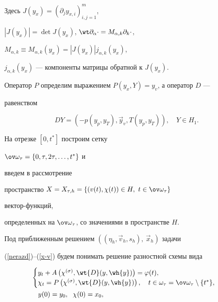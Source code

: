 Здесь $J(y_x)=(\partial_{j}y_{x,i})^m_{i,j=1}$,


$|J(y_x)|=\det J(y_x)$, $\wt \partial_{\alpha}\cdot=


M_{\alpha,k}\partial_{k}\cdot$,


$M_{\alpha,k}\equiv M_{\alpha,k}(y_x)=|J(y_x)| j_{\alpha,k}(y_x)$,


$j_{\alpha,k}(y_x)$ --- компоненты матрицы обратной к $J(y_x)$.


Оператор $P$ определим выражением $P(y_x,Y)=y_v$, а оператор $D$ ---


равенством


\begin{equation}


\label{opD}


DY=\left(-p(y_p,y_T),\Vec y_v,T(y_p,y_T) \right),\quad Y\in H_1.


\end{equation}


На отрезке $[0,t^*]$ построим сетку


$\ov\omega_\tau=\{0,\tau,2\tau,\dotsc,t^*\}$ и 


введем в рассмотрение


пространство $X=X_{\tau,h}=\{(v(t),\chi(t))\in H,\ t\in\ov\omega_\tau\}$ 


вектор-функций, 


определенных на $\ov \omega_\tau$, со значениями в пространстве $H$.


Под приближенным решением $((\eta_h,\Vec v_h,s_h),\ \Vec x_h)$ задачи


(\ref{nerazd})--(\ref{x-v}) будем понимать решение разностной схемы вида


\begin{align}


&


\begin{cases}


y_t+A\left(\chi^{(\sigma )},\wt{D}(y,\wh{y})\right)=\varphi(t),\\


\chi_{t}=P\left(\chi^{(\sigma )},\wt{D}(y,\wh{y})\right),


\quad t\in\omega_\tau=\ov\omega_\tau\setminus\{t^*\}, \label{1}


\end{cases}


\\


&\quad y(0)=y_0, \ \; \chi(0)=x_0\notag,


\end{align}


